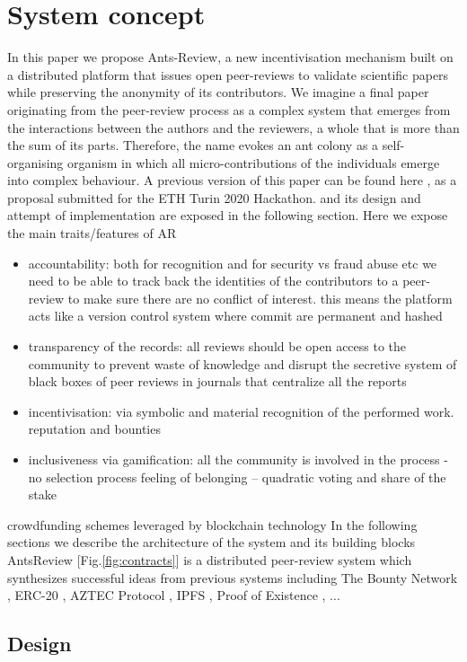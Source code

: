 \documentclass[runningheads]{llncs}
\begin{document}
\section{System concept}
In this paper we propose Ants-Review, a new incentivisation mechanism built on a distributed platform that issues open peer-reviews to validate scientific papers while preserving the anonymity of its contributors. We imagine a final paper originating from the peer-review process as a complex system that emerges from the interactions between the authors and the reviewers, a whole that is more than the sum of its parts. Therefore, the name evokes an ant colony as a self-organising organism in which all micro-contributions of the individuals emerge into complex behaviour.
A previous version of this paper can be found here \cite{AntsReview}, as a proposal submitted for the ETH Turin 2020 Hackathon.
and its design and attempt of implementation are exposed in the following section.
Here we expose the main traits/features of AR
\begin{itemize}
\item accountability: both for recognition and for security vs fraud abuse etc we need to be able to track back the identities of the contributors to a peer-review to make sure there are no conflict of interest. this means the platform acts like a version control system where commit are permanent and hashed 
\item transparency of the records: all reviews should be open access to the community to prevent waste of knowledge and disrupt the secretive system of black boxes of peer reviews in journals that centralize all the reports 
\item incentivisation: via symbolic and material recognition of the performed work. reputation and bounties
\item inclusiveness via gamification: all the community is involved in the process - no selection process feeling of belonging -- quadratic voting and share of the stake
\end{itemize}
crowdfunding schemes leveraged by blockchain technology
In the following sections we describe the architecture of the system and its building blocks
AntsReview [Fig.\ref{fig:contracts}] is a distributed peer-review system which synthesizes successful ideas from previous systems including The Bounty Network \cite{Bounty}, ERC-20 \cite{ERC20}, AZTEC Protocol \cite{AZTEC}, IPFS \cite{IPFS}, Proof of Existence \cite{TimeStamp-Haber}, ...

\subsection{Design}
\end{document}
